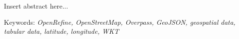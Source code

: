 \lipsum[1-3]

Insert abstract here...

Keywords: \textit{OpenRefine, OpenStreetMap, Overpass, GeoJSON, geospatial data, tabular data, latitude, longitude, WKT}